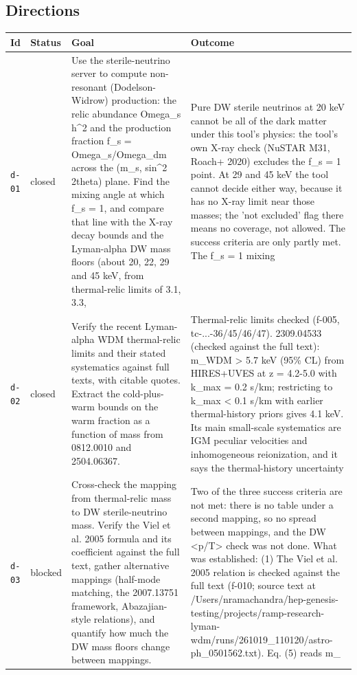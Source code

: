 \documentclass[11pt,a4paper]{article}
\begin{document}
\subsection{Directions}
\begin{longtable}{@{}p{}p{}p{}p{}@{}}
\toprule Id & Status & Goal & Outcome \\ \midrule \endhead
\texttt{d-01} & closed & Use the sterile-neutrino server to compute non-resonant (Dodelson-Widrow) production: the relic abundance Omega\_s h\textasciicircum{}2 and the production fraction f\_s = Omega\_s/Omega\_dm across the (m\_s, sin\textasciicircum{}2 2theta) plane. Find the mixing angle at which f\_s = 1, and compare that line with the X-ray decay bounds and the Lyman-alpha DW mass floors (about 20, 22, 29 and 45 keV, from thermal-relic limits of 3.1, 3.3, & Pure DW sterile neutrinos at 20 keV cannot be all of the dark matter under this tool's physics: the tool's own X-ray check (NuSTAR M31, Roach+ 2020) excludes the f\_s = 1 point. At 29 and 45 keV the tool cannot decide either way, because it has no X-ray limit near those masses; the 'not excluded' flag there means no coverage, not allowed. The success criteria are only partly met. The f\_s = 1 mixing \\
\texttt{d-02} & closed & Verify the recent Lyman-alpha WDM thermal-relic limits and their stated systematics against full texts, with citable quotes. Extract the cold-plus-warm bounds on the warm fraction as a function of mass from 0812.0010 and 2504.06367. & Thermal-relic limits checked (f-005, tc-...-36/45/46/47). 2309.04533 (checked against the full text): m\_WDM \textgreater{} 5.7 keV (95\% CL) from HIRES+UVES at z = 4.2-5.0 with k\_max = 0.2 s/km; restricting to k\_max \textless{} 0.1 s/km with earlier thermal-history priors gives 4.1 keV. Its main small-scale systematics are IGM peculiar velocities and inhomogeneous reionization, and it says the thermal-history uncertainty \\
\texttt{d-03} & blocked & Cross-check the mapping from thermal-relic mass to DW sterile-neutrino mass. Verify the Viel et al. 2005 formula and its coefficient against the full text, gather alternative mappings (half-mode matching, the 2007.13751 framework, Abazajian-style relations), and quantify how much the DW mass floors change between mappings. & Two of the three success criteria are not met: there is no table under a second mapping, so no spread between mappings, and the DW \textless{}p/T\textgreater{} check was not done. What was established: (1) The Viel et al. 2005 relation is checked against the full text (f-010; source text at /Users/nramachandra/hep-genesis-testing/projects/ramp-research-lyman-wdm/runs/261019\_110120/astro-ph\_0501562.txt). Eq. (5) reads m\_ \\

\end{longtable}
\end{document}
